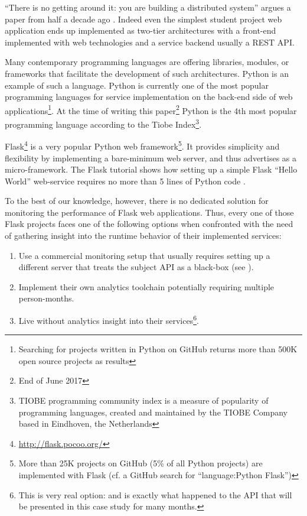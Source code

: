 \documentclass[conference]{IEEEtran}
\begin{document}
``There is no getting around it: you are building a distributed system'' argues a paper from half a decade ago \cite{cavage2013there}. Indeed even the simplest student project web application ends up implemented as two-tier architectures with a front-end implemented with web technologies and a service backend usually a REST API.

Many contemporary programming languages are offering libraries, modules, or frameworks that facilitate the development of such architectures. Python is an example of such a language. 
%
Python is currently one of the most popular programming languages for service implementation on the back-end side of web applications\footnote{Searching for projects written in Python on GitHub returns more than 500K open source projects as results}. At the time of writing this paper\footnote{End of June 2017} Python is the 4th most popular programming language according to the Tiobe Index\footnote{TIOBE programming community index is a measure of popularity of programming languages, created and maintained by the TIOBE Company based in Eindhoven, the Netherlands}. 
 
Flask\footnote{\url{http://flask.pocoo.org/}} is a very popular Python web framework\footnote{More than 25K projects on GitHub (5\% of all Python projects) are implemented with Flask (cf. a GitHub search for ``language:Python Flask'')}. It provides simplicity and flexibility by implementing a bare-minimum web server, and thus advertises as a micro-framework. The Flask tutorial shows how setting up a simple Flask ``Hello World'' web-service requires no more than 5 lines of Python code \cite{ flask:tutorial}.
 
To the best of our knowledge, however, there is no dedicated solution for monitoring the performance of Flask web applications. Thus, every one of those Flask projects faces one of the following options when confronted with the need of gathering insight into the runtime behavior of their implemented services: 

  \begin{enumerate}

    \item Use a commercial monitoring setup that usually requires setting up a different server that treats the subject API as a black-box (see ). 

    \item Implement their own analytics toolchain potentially requiring multiple person-months. 

    \item Live without analytics insight into their services\footnote{This is very real option: and is exactly what happened to the API that will be presented in this case study for many months.}.

  \end{enumerate}
\end{document}
